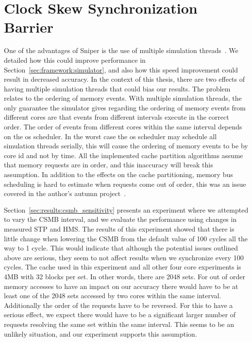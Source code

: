 \section{Clock Skew Synchronization Barrier}

One of the advantages of Sniper is the use of multiple simulation threads~\cite{Carlson2011a}.
We detailed how this could improve performance in Section~\ref{sec:framework:simulator}, and also how this speed improvement could result in decreased accuracy.
In the context of this thesis, there are two effects of having multiple
simulation threads that could bias our results.
The problem relates to the ordering of memory events.
With multiple simulation threads, the only guarantee the simulator gives regarding the ordering of memory events from different cores are that events from different intervals execute in the correct order.
The order of events from different cores within the same interval depends on the os scheduler.
In the worst case the os scheduler may schedule all simulation threads serially, this will cause the ordering of memory events to be by core id and not by time.
All the implemented cache partition algorithms assume that memory requests are in order, and this inaccuracy will break this assumption.
In addition to the effects on the cache partitioning, memory bus scheduling is hard to estimate when requests come out of order, this was an issue covered in the author's autumn project~\cite{Olsen2014}.

Section~\ref{sec:results:csmb_sensitivity} presents an experiment where we attempted to vary the CSMB interval, and we evaluate the performance using changes in measured STP and HMS.
The results of this experiment showed that there is little change when lowering the CSMB from the default value of 100 cycles all the way to 1 cycle.
This would indicate that although the potential issues outlined above are serious, they seem to not affect results when we synchronize every 100 cycles.
The cache used in this experiment and all other four core experiments is 4MB with 32 blocks per set.
In other words, there are 2048 sets.
For out of order memory accesses to have an impact on our accuracy there would have to be at least one of the 2048 sets accessed by two cores within the same interval.
Additionally the order of the requests have to be reversed.
For this to have a serious effect, we expect there would have to be a significant larger number of requests resolving the same set within the same interval.
This seems to be an unlikely situation, and our experiment supports this assumption.

